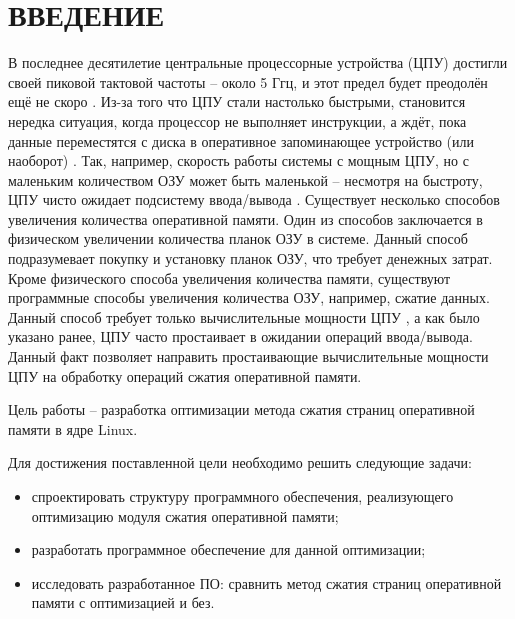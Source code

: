 \section*{ВВЕДЕНИЕ}

В последнее десятилетие центральные процессорные устройства (ЦПУ) достигли своей пиковой тактовой частоты -- около 5 Ггц, и этот предел будет преодолён ещё не скоро \cite{cpu_pick}. Из-за того что ЦПУ стали настолько быстрыми, становится нередка ситуация, когда процессор не выполняет инструкции, а ждёт, пока данные переместятся с диска в оперативное запоминающее устройство (или наоборот) \cite{in-kernel-memory-compression}. Так, например, скорость работы системы с мощным ЦПУ, но с маленьким количеством ОЗУ может быть маленькой -- несмотря на быстроту, ЦПУ чисто ожидает подсистему ввода/вывода \cite{in-kernel-memory-compression}. Существует несколько способов увеличения количества оперативной памяти. Один из способов заключается в физическом увеличении количества планок ОЗУ в системе. Данный способ подразумевает покупку и установку планок ОЗУ, что требует денежных затрат. Кроме физического способа увеличения количества памяти, существуют программные способы увеличения количества ОЗУ, например, сжатие данных. Данный способ требует только вычислительные мощности ЦПУ \cite{data-compression-encyclopedia}, а как было указано ранее, ЦПУ часто простаивает в ожидании операций ввода/вывода. Данный факт позволяет направить простаивающие вычислительные мощности ЦПУ на обработку операций сжатия оперативной памяти. 

Цель работы -- разработка оптимизации метода сжатия страниц оперативной памяти в ядре Linux.

Для достижения поставленной цели необходимо решить следующие задачи:

\begin{itemize}
	\item спроектировать структуру программного обеспечения, реализующего оптимизацию модуля сжатия оперативной памяти;
	\item разработать программное обеспечение для данной оптимизации;
	\item исследовать разработанное ПО: сравнить метод сжатия страниц оперативной памяти с оптимизацией и без.
\end{itemize}

\pagebreak
